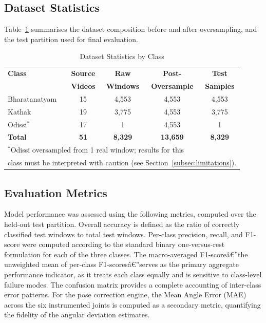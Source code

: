\documentclass[journal]{IEEEtran}
\begin{document}
\subsection{Dataset Statistics}

Table~\ref{tab:dataset} summarises the dataset composition before and
after oversampling, and the test partition used for final evaluation.

\begin{table}[!t]
\caption{Dataset Statistics by Class}
\label{tab:dataset}
\centering
\begin{tabular}{lcccc}
\toprule
\textbf{Class} & \textbf{Source} & \textbf{Raw} & \textbf{Post-} & \textbf{Test}\\
& \textbf{Videos} & \textbf{Windows} & \textbf{Oversample} & \textbf{Samples}\\
\midrule
Bharatanatyam & 15 & 4,553 & 4,553 & 4,553 \\
Kathak        & 19 & 3,775 & 4,553 & 3,775 \\
Odissi$^{*}$  & 17 & 1     & 4,553 & 1 \\
\midrule
\textbf{Total} & \textbf{51} & \textbf{8,329} & \textbf{13,659} & \textbf{8,329} \\
\bottomrule
\multicolumn{5}{l}{$^{*}$Odissi oversampled from 1 real window; results for this}\\
\multicolumn{5}{l}{class must be interpreted with caution (see Section~\ref{subsec:limitations}).}\\
\end{tabular}
\end{table}

\subsection{Evaluation Metrics}

Model performance was assessed using the following metrics, computed
over the held-out test partition. Overall accuracy is defined as the
ratio of correctly classified test windows to total test windows.
Per-class precision, recall, and F1-score were computed according to
the standard binary one-versus-rest formulation for each of the three
classes. The macro-averaged F1-scoreâ€”the unweighted mean of per-class
F1-scoresâ€”serves as the primary aggregate performance indicator, as
it treats each class equally and is sensitive to class-level failure
modes. The confusion matrix provides a complete accounting of
inter-class error patterns. For the pose correction engine, the
Mean Angle Error (MAE) across the six instrumented joints is computed
as a secondary metric, quantifying the fidelity of the angular
deviation estimates.
\end{document}
